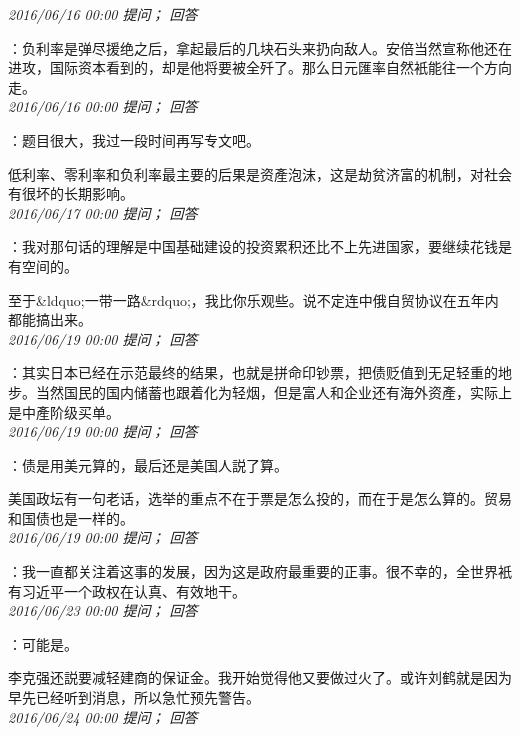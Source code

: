 \documentclass[twocolumn]{ctexart}
\begin{document}
\textit{\hfill\noindent\small 2016/06/16 00:00 提问； 回答}

：负利率是弹尽援绝之后，拿起最后的几块石头来扔向敌人。安倍当然宣称他还在进攻，国际资本看到的，却是他将要被全歼了。那么日元匯率自然衹能往一个方向走。\\

\textit{\hfill\noindent\small 2016/06/16 00:00 提问； 回答}

：题目很大，我过一段时间再写专文吧。

低利率、零利率和负利率最主要的后果是资產泡沫，这是劫贫济富的机制，对社会有很坏的长期影响。\\

\textit{\hfill\noindent\small 2016/06/17 00:00 提问； 回答}

：我对那句话的理解是中国基础建设的投资累积还比不上先进国家，要继续花钱是有空间的。

至于\&ldquo;一带一路\&rdquo;，我比你乐观些。说不定连中俄自贸协议在五年内都能搞出来。\\

\textit{\hfill\noindent\small 2016/06/19 00:00 提问； 回答}

：其实日本已经在示范最终的结果，也就是拼命印钞票，把债贬值到无足轻重的地步。当然国民的国内储蓄也跟着化为轻烟，但是富人和企业还有海外资產，实际上是中產阶级买单。\\

\textit{\hfill\noindent\small 2016/06/19 00:00 提问； 回答}

：债是用美元算的，最后还是美国人説了算。

美国政坛有一句老话，选举的重点不在于票是怎么投的，而在于是怎么算的。贸易和国债也是一样的。\\

\textit{\hfill\noindent\small 2016/06/19 00:00 提问； 回答}

：我一直都关注着这事的发展，因为这是政府最重要的正事。很不幸的，全世界衹有习近平一个政权在认真、有效地干。\\

\textit{\hfill\noindent\small 2016/06/23 00:00 提问； 回答}

：可能是。

李克强还説要减轻建商的保证金。我开始觉得他又要做过火了。或许刘鹤就是因为早先已经听到消息，所以急忙预先警告。\\

\textit{\hfill\noindent\small 2016/06/24 00:00 提问； 回答}
\end{document}
